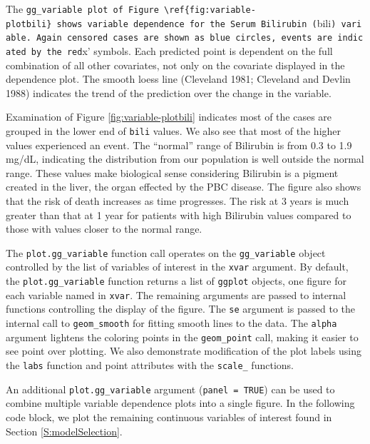 \documentclass[article]{jss}
\begin{document}
The
\texttt{gg\_variable\ plot\ of\ Figure\ \textbackslash{}ref\{fig:variable-plotbili\}\ shows\ variable\ dependence\ for\ the\ Serum\ Bilirubin\ (}bili\texttt{)\ variable.\ Again\ censored\ cases\ are\ shown\ as\ blue\ circles,\ events\ are\ indicated\ by\ the\ red}x'
symbols. Each predicted point is dependent on the full combination of
all other covariates, not only on the covariate displayed in the
dependence plot. The smooth loess line (Cleveland 1981; Cleveland and
Devlin 1988) indicates the trend of the prediction over the change in
the variable.

Examination of Figure \ref{fig:variable-plotbili} indicates most of the
cases are grouped in the lower end of \texttt{bili} values. We also see
that most of the higher values experienced an event. The ``normal''
range of Bilirubin is from 0.3 to 1.9 mg/dL, indicating the distribution
from our population is well outside the normal range. These values make
biological sense considering Bilirubin is a pigment created in the
liver, the organ effected by the PBC disease. The figure also shows that
the risk of death increases as time progresses. The risk at 3 years is
much greater than that at 1 year for patients with high Bilirubin values
compared to those with values closer to the normal range.

The \texttt{plot.gg\_variable} function call operates on the
\texttt{gg\_variable} object controlled by the list of variables of
interest in the \texttt{xvar} argument. By default, the
\texttt{plot.gg\_variable} function returns a list of \texttt{ggplot}
objects, one figure for each variable named in \texttt{xvar}. The
remaining arguments are passed to internal  functions
controlling the display of the figure. The \texttt{se} argument is
passed to the internal call to \texttt{geom\_smooth} for fitting smooth
lines to the data. The \texttt{alpha} argument lightens the coloring
points in the \texttt{geom\_point} call, making it easier to see point
over plotting. We also demonstrate modification of the plot labels using
the \texttt{labs} function and point attributes with the
\texttt{scale\_} functions.

An additional \texttt{plot.gg\_variable} argument
(\texttt{panel\ =\ TRUE}) can be used to combine multiple variable
dependence plots into a single figure. In the following code block, we
plot the remaining continuous variables of interest found in Section
\ref{S:modelSelection}.
\end{document}
